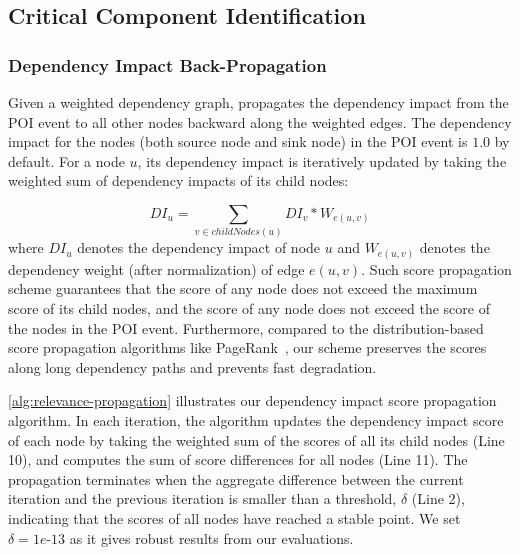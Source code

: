 \subsection{Critical Component Identification}
\label{subsec:phase3}




\subsubsection{Dependency Impact Back-Propagation}
\label{subsubsec:propagation}

Given a weighted dependency graph, \tool propagates the dependency impact from the POI event to all other nodes backward along the weighted edges. 
The dependency impact for the nodes (both source node and sink node) in the POI event is $1.0$ by default.
%
For a node $u$, its dependency impact is iteratively updated by taking the weighted sum of dependency impacts of its child nodes: 

\begin{equation}
    \label{eq:reputation}
     DI_{u} =\sum_{v \in childNodes(u)} DI_{v}*W_{e(u,v)}
\end{equation}
where $ DI_{u}$ denotes the dependency impact of node $u$ and $W_{e(u,v)}$ denotes the dependency weight (after normalization) of edge $e(u,v)$.
%
Such score propagation scheme guarantees that the score of any node does not exceed the maximum score of its child nodes, and the score of any node does not exceed the score of the nodes in the POI event.
%
Furthermore, compared to the distribution-based score propagation algorithms like PageRank~\cite{pagerank}, our scheme preserves the scores along long dependency paths and prevents fast degradation.


\cref{alg:relevance-propagation} illustrates our dependency impact score propagation algorithm. 
In each iteration, the algorithm updates the dependency impact score of each node by taking the weighted sum of the scores of  all its child nodes (Line 10), and computes the sum of score differences for all nodes (Line 11).
The propagation terminates when the aggregate difference between the current iteration and the previous iteration is smaller than a threshold, $\delta$ (Line 2), indicating that the scores of all nodes have reached a stable point.
We set $\delta = 1e\mbox{-}13$ as it gives robust results from our evaluations.



